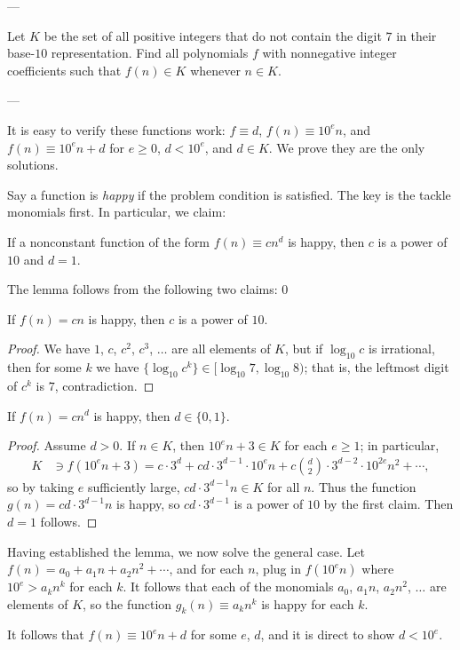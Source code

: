
---

Let $K$ be the set of all positive integers that do not contain the digit $7$ in their base-$10$ representation. Find all polynomials $f$ with nonnegative integer coefficients such that $f(n)\in K$ whenever $n\in K$.

---

It is easy to verify these functions work: $f\equiv d$, $f(n)\equiv10^en$, and $f(n)\equiv10^en+d$ for $e\ge0$, $d<10^e$, and $d\in K$. We prove they are the only solutions.

Say a function is \emph{happy} if the problem condition is satisfied. The key is the tackle monomials first. In particular, we claim:
\begin{lemma*}
    If a nonconstant function of the form $f(n)\equiv cn^d$ is happy, then $c$ is a power of $10$ and $d=1$.
\end{lemma*}
The lemma follows from the following two claims:
\setcounter{claim}0
\begin{claim}
    If $f(n)=cn$ is happy, then $c$ is a power of $10$.
\end{claim}
\begin{proof}
    We have $1$, $c$, $c^2$, $c^3$, $\ldots$ are all elements of $K$, but if $\log_{10}c$ is irrational, then for some $k$ we have $\{\log_{10}c^k\}\in[\log_{10}7,\log_{10}8)$; that is, the leftmost digit of $c^k$ is $7$, contradiction.
\end{proof}
\begin{claim}
    If $f(n)=cn^d$ is happy, then $d\in\{0,1\}$.
\end{claim}
\begin{proof}
    Assume $d>0$. If $n\in K$, then $10^en+3\in K$ for each $e\ge1$; in particular,
    \begin{align*}
        K&\ni f(10^en+3)=c\cdot3^d+cd\cdot3^{d-1}\cdot10^en+c\binom d2\cdot3^{d-2}\cdot10^{2e}n^2+\cdots,
    \end{align*}
    so by taking $e$ sufficiently large, $cd\cdot3^{d-1}n\in K$ for all $n$. Thus the function $g(n)=cd\cdot3^{d-1}n$ is happy, so $cd\cdot3^{d-1}$ is a power of $10$ by the first claim. Then $d=1$ follows.
\end{proof}

Having established the lemma, we now solve the general case. Let $f(n)=a_0+a_1n+a_2n^2+\cdots$, and for each $n$, plug in $f(10^en)$ where $10^e>a_kn^k$ for each $k$. It follows that each of the monomials $a_0$, $a_1n$, $a_2n^2$, $\ldots$ are elements of $K$, so the function $g_k(n)\equiv a_kn^k$ is happy for each $k$.

It follows that $f(n)\equiv10^en+d$ for some $e$, $d$, and it is direct to show $d<10^e$.

